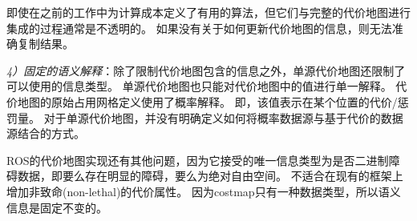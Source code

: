 
即使在之前的工作中为计算成本定义了有用的算法，但它们与完整的代价地图进行集成的过程通常是不透明的。 如果没有关于如何更新代价地图的信息，则无法准确复制结果。


\emph{\color{blue}4）固定的语义解释}：除了限制代价地图包含的信息之外，单源代价地图还限制了可以使用的信息类型。 单源代价地图也只能对代价地图中的值进行单一解释。 代价地图的原始占用网格定义使用了概率解释。 即，该值表示在某个位置的代价/惩罚量。 对于单源代价地图，并没有明确定义如何将概率数据源与基于代价的数据源结合的方式。


%
%

ROS的代价地图实现还有其他问题，因为它接受的唯一信息类型为是否二进制障碍数据，即要么存在明显的障碍，要么为绝对自由空间。 不适合在现有的框架上增加非致命(non-lethal)的代价属性。 因为costmap只有一种数据类型，所以语义信息是固定不变的。

